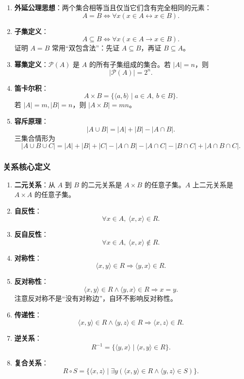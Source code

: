 \begin{enumerate}
	\item \textbf{外延公理思想}：两个集合相等当且仅当它们含有完全相同的元素：
	\[
	A=B\Leftrightarrow \forall x(x\in A\leftrightarrow x\in B).
	\]
	\item \textbf{子集定义}：
	\[
	A\subseteq B\Leftrightarrow \forall x(x\in A\to x\in B).
	\]
	证明 \(A=B\) 常用“双包含法”：先证 \(A\subseteq B\)，再证 \(B\subseteq A\)。
	\item \textbf{幂集定义}：\(\mathcal P(A)\) 是 \(A\) 的所有子集组成的集合。若 \(|A|=n\)，则
	\[
	|\mathcal P(A)|=2^n.
	\]
	\item \textbf{笛卡尔积}：
	\[
	A\times B=\{\langle a,b\rangle\mid a\in A,\ b\in B\}.
	\]
	若 \(|A|=m,|B|=n\)，则 \(|A\times B|=mn\)。
	\item \textbf{容斥原理}：
	\[
	|A\cup B|=|A|+|B|-|A\cap B|.
	\]
	三集合情形为
	\[
	|A\cup B\cup C|=|A|+|B|+|C|-|A\cap B|-|A\cap C|-|B\cap C|+|A\cap B\cap C|.
	\]
\end{enumerate}

\subsubsection{关系核心定义}

\begin{enumerate}
	\item \textbf{二元关系}：从 \(A\) 到 \(B\) 的二元关系是 \(A\times B\) 的任意子集。\(A\) 上二元关系是 \(A\times A\) 的任意子集。
	\item \textbf{自反性}：
	\[
	\forall x\in A,\ \langle x,x\rangle\in R.
	\]
	\item \textbf{反自反性}：
	\[
	\forall x\in A,\ \langle x,x\rangle\notin R.
	\]
	\item \textbf{对称性}：
	\[
	\langle x,y\rangle\in R\Rightarrow\langle y,x\rangle\in R.
	\]
	\item \textbf{反对称性}：
	\[
	\langle x,y\rangle\in R\land\langle y,x\rangle\in R\Rightarrow x=y.
	\]
	注意反对称不是“没有对称边”，自环不影响反对称性。
	\item \textbf{传递性}：
	\[
	\langle x,y\rangle\in R\land\langle y,z\rangle\in R\Rightarrow\langle x,z\rangle\in R.
	\]
	\item \textbf{逆关系}：
	\[
	R^{-1}=\{\langle y,x\rangle\mid \langle x,y\rangle\in R\}.
	\]
	\item \textbf{复合关系}：
	\[
	R\circ S=\{\langle x,z\rangle\mid \exists y(\langle x,y\rangle\in R\land \langle y,z\rangle\in S)\}.
	\]
\end{enumerate}

